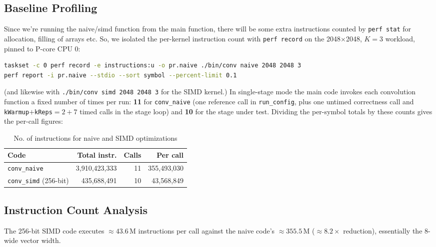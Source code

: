 \documentclass[11pt]{article}
\begin{document}
\subsection{Baseline Profiling}

Since we're running the naive/simd function from the main function,
there will be some extra instructions counted by \texttt{perf stat} for
allocation, filling of arrays etc.
So, we isolated the
per-kernel instruction count with \texttt{perf record} on the
2048$\times$2048, $K=3$ workload, pinned to P-core CPU 0:

\begin{lstlisting}[language=bash]
taskset -c 0 perf record -e instructions:u -o pr.naive ./bin/conv naive 2048 2048 3
perf report -i pr.naive --stdio --sort symbol --percent-limit 0.1
\end{lstlisting}

(and likewise with \texttt{./bin/conv simd 2048 2048 3} for the SIMD kernel.)
In single-stage mode the main code invokes each convolution function a fixed number of times per
run: \textbf{11} for \texttt{conv\_naive} (one reference call in
\texttt{run\_config}, plus one untimed correctness call and
\texttt{kWarmup}$+$\texttt{kReps}$=2+7$ timed calls in the stage loop) and
\textbf{10} for the stage under test. Dividing the per-symbol totals by these
counts gives the per-call figures:

\begin{table}[H]
    \centering
    \begin{tabular}{lrrr}
        \toprule
        \textbf{Code} & \textbf{Total instr.} & \textbf{Calls} & \textbf{Per call} \\
        \midrule
        \texttt{conv\_naive}          & 3{,}910{,}423{,}333 & 11 & 355{,}493{,}030 \\
        \texttt{conv\_simd} (256-bit) & 435{,}688{,}491     & 10 & 43{,}568{,}849 \\
        \bottomrule
    \end{tabular}
    \caption{No. of instructions for naive and SIMD optimizations}
    \label{tab:simd-icount}
\end{table}

\subsection{Instruction Count Analysis}

The 256-bit SIMD code executes $\approx 43.6$\,M instructions per call against
the naive code's $\approx 355.5$\,M (\textbf{$\approx 8.2\times$}
reduction), essentially the 8-wide vector width.
\end{document}
